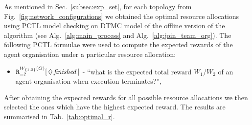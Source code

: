 \documentclass{llncs}
\begin{document}
\begin{table}
\centering
{}
\caption{Model comparison for different number of agents in a fully connected agent organisation and different models for offline version of the Alg.~\ref{alg:main_process}.}
\label{tab:model_sizes}
\end{table}

As mentioned in Sec.~\ref{subsec:exp_set}, for each topology from Fig.~\ref{fig:network_configurations} we obtained the optimal resource allocations using PCTL model checking on DTMC model of the offline version of the algorithm (see Alg.~\ref{alg:main_process} and Alg.~\ref{alg:join_team_org}). The following PCTL formulae were used to compute the expected rewards of the agent organisation under a particular resource allocation:
\begin{itemize}
 \item ${\tt R}_{=?}^{W_{\{1,2\}}(O)}[\,\Diamond\,\mathit{finished}\,]$ -
``what is the expected total reward  $W_1$/$W_2$ of an agent organisation when execution terminates?'',
\end{itemize}
After obtaining the expected rewards for all possible resource allocations we then selected the ones which have the highest expected reward. The results are summarised in Tab.~\ref{tab:optimal_r}.
\end{document}
